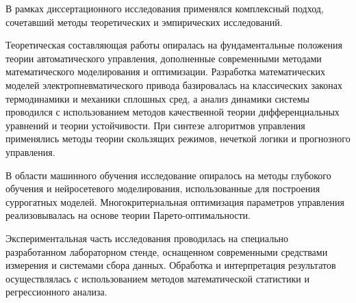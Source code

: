 {\methods}
В рамках диссертационного исследования применялся комплексный подход,
сочетавший методы теоретических и эмпирических  исследований.

Теоретическая составляющая работы опиралась на фундаментальные положения теории
автоматического управления, дополненные современными методами математического моделирования
и оптимизации. Разработка математических моделей электропневматического привода базировалась
на классических законах термодинамики и механики сплошных сред, а анализ динамики системы
проводился с использованием методов качественной теории дифференциальных уравнений и теории
устойчивости. При синтезе алгоритмов управления применялись методы теории скользящих режимов,
нечеткой логики и прогнозного управления.

В области машинного обучения исследование опиралось на методы глубокого обучения и нейросетевого
моделирования, использованные для построения суррогатных моделей. Многокритериальная оптимизация
параметров управления реализовывалась на основе теории Парето-оптимальности.

Экспериментальная часть исследования проводилась на специально разработанном лабораторном стенде,
оснащенном современными средствами измерения и системами сбора данных. Обработка и интерпретация
результатов осуществлялась с использованием методов математической статистики и регрессионного анализа.


